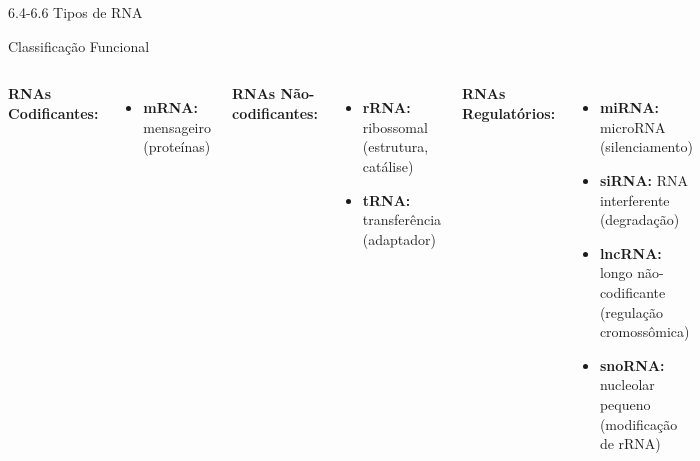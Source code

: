 \begin{frame}{6.4-6.6 Tipos de RNA}
\begin{block}{Classificação Funcional}
\begin{columns}
\textbf{RNAs Codificantes:}
\begin{itemize}
    \item \textbf{mRNA:} mensageiro\\
    (proteínas)
\end{itemize}

\vspace{0.3cm}

\textbf{RNAs Não-codificantes:}
\begin{itemize}
    \item \textbf{rRNA:} ribossomal\\
    (estrutura, catálise)
    \item \textbf{tRNA:} transferência\\
    (adaptador)
\end{itemize}

\textbf{RNAs Regulatórios:}
\begin{itemize}
    \item \textbf{miRNA:} microRNA\\
    (silenciamento)
    \item \textbf{siRNA:} RNA interferente\\
    (degradação)
    \item \textbf{lncRNA:} longo não-codificante\\
    (regulação cromossômica)
    \item \textbf{snoRNA:} nucleolar pequeno\\
    (modificação de rRNA)
\end{itemize}
\end{columns}
\end{block}
\end{frame}

